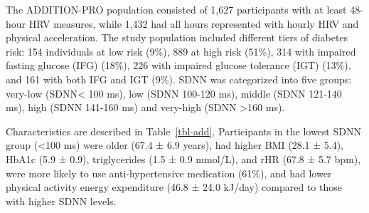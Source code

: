 \documentclass[
  letterpaper,
  headsepline=true,
  open=any]{scrbook}
\begin{document}
The ADDITION-PRO population consisted of 1,627 participants with at
least 48-hour HRV measures, while 1,432 had all hours represented with
hourly HRV and physical acceleration. The study population included
different tiers of diabetes risk: 154 individuals at low risk (9\%), 889
at high risk (51\%), 314 with impaired fasting glucose (IFG) (18\%), 226
with impaired glucose tolerance (IGT) (13\%), and 161 with both IFG and
IGT (9\%). SDNN was categorized into five groups: very-low
(SDNN\textless{} 100 ms), low (SDNN 100-120 ms), middle (SDNN 121-140
ms), high (SDNN 141-160 ms) and very-high (SDNN \textgreater160 ms).

Characteristics are described in Table~\ref{tbl-add}. Participants in
the lowest SDNN group (\textless100 ms) were older (67.4 ± 6.9 years),
had higher BMI (28.1 ± 5.4), HbA1c (5.9 ± 0.9), triglycerides (1.5 ± 0.9
mmol/L), and rHR (67.8 ± 5.7 bpm), were more likely to use
anti-hypertensive medication (61\%), and had lower physical activity
energy expenditure (46.8 ± 24.0 kJ/day) compared to those with higher
SDNN levels.

\end{document}
